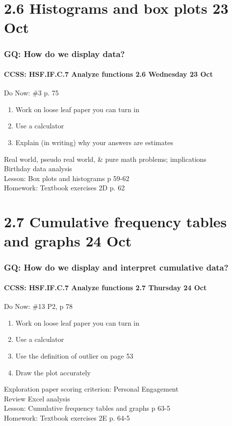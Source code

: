 \documentclass{beamer}
\begin{document}
  \section{2.6 Histograms and box plots 23 Oct}
  \frame
  {
    \frametitle{GQ: How do we display data?}
    \framesubtitle{CCSS: HSF.IF.C.7 Analyze functions \hfill \alert{2.6 Wednesday 23 Oct}}

    \begin{block}{Do Now: \#3 p. 75}
    \begin{enumerate}
        \item Work on loose leaf paper you can turn in
        \item Use a calculator
        \item Explain (in writing) why your answers are estimates
    \end{enumerate}
    \end{block}
    Real world, pseudo real world, \& pure math problems; implications \\
    Birthday data analysis \\
    Lesson: Box plots and histograms p 59-62\\ \smallskip
    Homework: Textbook exercises 2D p. 62
  }

  \section{2.7 Cumulative frequency tables and graphs 24 Oct}
  \frame
  {
    \frametitle{GQ: How do we display and interpret cumulative data?}
    \framesubtitle{CCSS: HSF.IF.C.7 Analyze functions \hfill \alert{2.7 Thursday 24 Oct}}

    \begin{block}{Do Now: \#13 P2, p 78}
    \begin{enumerate}
        \item Work on loose leaf paper you can turn in
        \item Use a calculator
        \item Use the definition of outlier on page 53
        \item Draw the plot accurately
    \end{enumerate}
    \end{block}
    Exploration paper scoring criterion: Personal Engagement \\
    Review Excel analysis \\
    Lesson: Cumulative frequency tables and graphs p 63-5\\ \smallskip
    Homework: Textbook exercises 2E p. 64-5
  }
\end{document}
